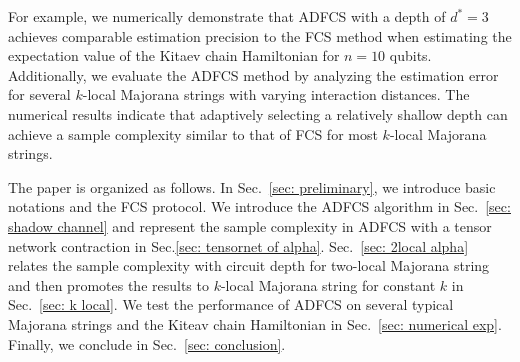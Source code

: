 \documentclass[journal=jctcce,a4paper,manuscript=article]{achemso}
\begin{document}
For example, we numerically demonstrate that ADFCS with a depth of $d^\ast = 3$
achieves comparable estimation precision to the FCS method when estimating the
expectation value of the Kitaev chain Hamiltonian for $n=10$ qubits.
Additionally, we evaluate the ADFCS method by analyzing the estimation error
for several $k$-local Majorana strings with varying interaction distances. The
numerical results indicate that adaptively selecting a relatively shallow depth
can achieve a sample complexity similar to that of FCS for most $k$-local
Majorana strings.

The paper is organized as follows. In Sec.~\ref{sec: preliminary}, we introduce
basic notations and the FCS protocol. We introduce the ADFCS algorithm in
Sec.~\ref{sec: shadow channel} and represent the sample complexity in ADFCS
with a tensor network contraction in Sec.\ref{sec: tensornet of alpha}.
Sec.~\ref{sec: 2local alpha} relates the sample complexity with circuit depth
for two-local Majorana string and then promotes the results to $k$-local
Majorana string for constant $k$ in Sec.~\ref{sec: k local}. We test the
performance of ADFCS on several typical Majorana strings and the Kiteav chain
Hamiltonian in Sec.~\ref{sec: numerical exp}. Finally, we conclude in
Sec.~\ref{sec: conclusion}.
\end{document}
